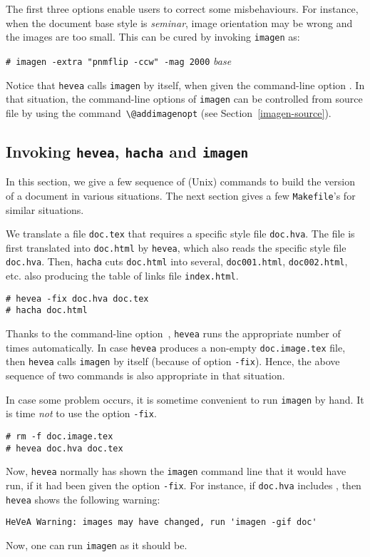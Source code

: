 The first three options enable users to correct some misbehaviours.
For instance, when the document base style is \textit{seminar}, image
orientation may
be wrong and the images are too small. This can be cured by invoking
\texttt{imagen} as:
\begin{flushleft}
\texttt{\# imagen  -extra "pnmflip -ccw" -mag 2000} \textit{base}
\end{flushleft}

Notice that \texttt{hevea} calls \texttt{imagen} by itself,
when given the command-line option .
In that situation, the command-line options of \texttt{imagen} can
be controlled from source file by using the
command~\verb+\@addimagenopt+ (see Section~\ref{imagen-source}).

\subsection{Invoking \texttt{hevea}, \texttt{hacha} and \texttt{imagen}}
In this section, we give a few sequence of (Unix) commands to build
the \html{} version of a document in various
situations. The next section gives a few
\texttt{Makefile}'s for similar situations.

We translate a file \texttt{doc.tex}
that requires a specific style file \texttt{doc.hva}.
The file is first translated into \texttt{doc.html} by \texttt{hevea},
which also reads
the specific style file \texttt{doc.hva}.
Then, \texttt{hacha} cuts \texttt{doc.html} into several,
\texttt{doc001.html}, \texttt{doc002.html}, etc. also producing the
table of links file \texttt{index.html}.
\begin{verbatim}
# hevea -fix doc.hva doc.tex
# hacha doc.html
\end{verbatim}
Thanks to the command-line option~, \texttt{hevea} runs the
appropriate number of times automatically.
In case \texttt{hevea} produces a non-empty \texttt{doc.image.tex}
file, then \texttt{hevea} calls \texttt{imagen} by itself
(because of option \texttt{-fix}).
Hence, the above sequence of two commands is also appropriate in
that situation.

In case some problem occurs, it is sometime convenient to
run \texttt{imagen} by hand.
It is time \emph{not} to use the option \texttt{-fix}.
\begin{verbatim}
# rm -f doc.image.tex
# hevea doc.hva doc.tex
\end{verbatim}
Now, \texttt{hevea} normally has shown the \texttt{imagen}
command line that it would have run, if it had been given
the option \texttt{-fix}.
For instance, if \texttt{doc.hva} includes \verb++, then
\texttt{hevea} shows the following warning:
\begin{verbatim}
HeVeA Warning: images may have changed, run 'imagen -gif doc'
\end{verbatim}
Now, one can run \texttt{imagen} as it should be.

